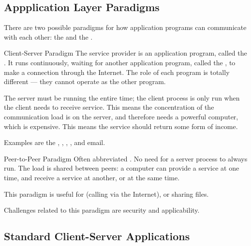 \documentclass[\main/notes.tex]{subfiles}
\begin{document}
			\subsection{Appplication Layer Paradigms}
				There are two possible paradigms for how application programs can communicate with each other: the  and the .
				\begin{definition}{Client-Server Paradigm}
					The service provider is an application program, called the . It runs continuously, waiting for another application program, called the , to make a connection through the Internet. The role of each program is totally different --- they cannot operate as the other program.

					The server must be running the entire time; the client process is only run when the client needs to receive service. This means the concentration of the communication load is on the server, and therefore needs a powerful computer, which is expensive. This means the service should return some form of income.

					Examples are the , , , , and email.
				\end{definition}
				\begin{definition}{Peer-to-Peer Paradigm}
					Often abbreviated . No need for a server process to always run. The load is shared between peers: a computer can provide a service at one time, and receive a service at another, or at the same time.

					This paradigm is useful for  (calling via the Internet), or sharing files.

					Challenges related to this paradigm are security and applicability.
				\end{definition}

			\subsection{Standard Client-Server Applications}
\end{document}
